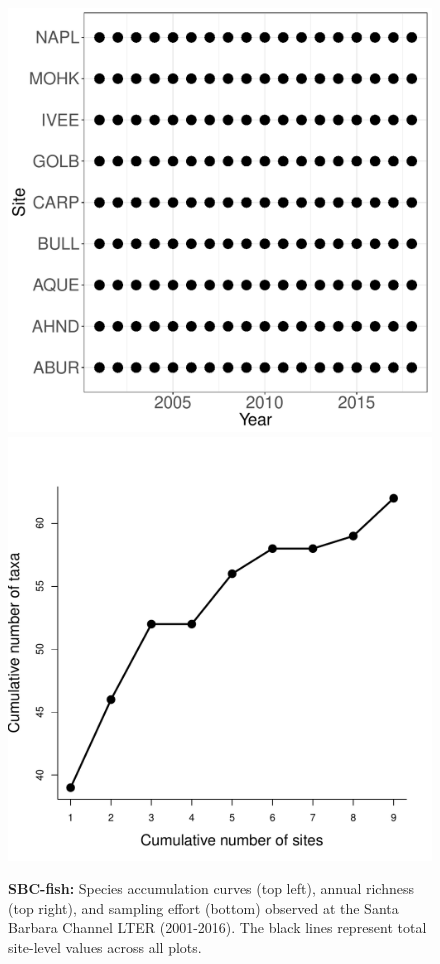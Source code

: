 \documentclass[11pt, oneside]{article}
\begin{document}
\begin{figure}[h!]
\includegraphics[scale = 0.4]{sbc-fish-castorani_spatiotemporal_sampling_effort.pdf}
\includegraphics[scale = 0.4]{sbc-fish-castorani_species_accumulation_space.pdf}
\caption{{\bf SBC-fish:} Species accumulation curves (top left),  annual richness (top right), and sampling effort (bottom)  observed at the Santa Barbara Channel LTER (2001-2016). The black lines represent total site-level values across all plots.}
\label{sbc-fish}
\end{figure}
\end{document}
